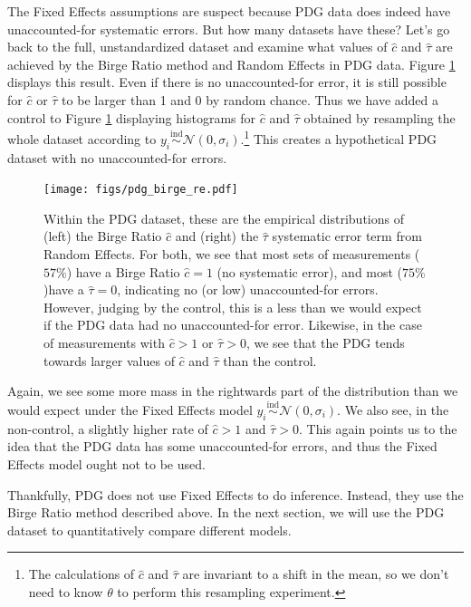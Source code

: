 \documentclass[12pt]{article}
\begin{document}
The Fixed Effects assumptions are suspect because PDG data does indeed have unaccounted-for systematic errors. But how many datasets have these? Let's go back to the full, unstandardized dataset and examine what values of $\hat c$ and $\hat \tau$ are achieved by the Birge Ratio method and Random Effects in PDG data. Figure \ref{fig:pdg-birge-re} displays this result. Even if there is no unaccounted-for error, it is still possible for $\hat c$ or $\hat \tau$ to be larger than 1 and 0 by random chance. Thus we have added a control to Figure \ref{fig:pdg-birge-re} displaying histograms for $\hat c$ and $\hat \tau$ obtained by resampling the whole dataset according to $y_i\overset{\mathrm{ind}}{\sim}\mathcal{N}(0, \sigma_i)$.\footnote{The calculations of $\hat c$ and $\hat \tau$ are invariant to a shift in the mean, so we don't need to know $\theta$ to perform this resampling experiment.} This creates a hypothetical PDG dataset with no unaccounted-for errors.

\begin{figure}[H]
\centering
\texttt{[image: figs/pdg\_birge\_re.pdf]}
\caption{Within the PDG dataset, these are the empirical distributions of (left) the Birge Ratio $\hat c$ and (right) the $\hat\tau$ systematic error term from Random Effects. For both, we see that most sets of measurements ($57\%$) have a Birge Ratio $\hat c=1$ (no systematic error), and most ($75\%$)have a $\hat\tau=0$, indicating no (or low) unaccounted-for errors. However, judging by the control, this is a less than we would expect if the PDG data had no unaccounted-for error. Likewise, in the case of measurements with $\hat c>1$ or $\hat\tau>0$, we see that the PDG tends towards larger values of $\hat c$ and $\hat\tau$ than the control.
}
\label{fig:pdg-birge-re}
\end{figure}


Again, we see some more mass in the rightwards part of the distribution than we would expect under the Fixed Effects model $y_i\overset{\mathrm{ind}}{\sim}\mathcal{N}(0, \sigma_i)$. We also see, in the non-control, a slightly higher rate of $\hat c >1$ and $\hat \tau > 0$. This again points us to the idea that the PDG data has some unaccounted-for errors, and thus the Fixed Effects model ought not to be used.

Thankfully, PDG does not use Fixed Effects to do inference. Instead, they use the Birge Ratio method described above. In the next section, we will use the PDG dataset to quantitatively compare different models.
\end{document}
